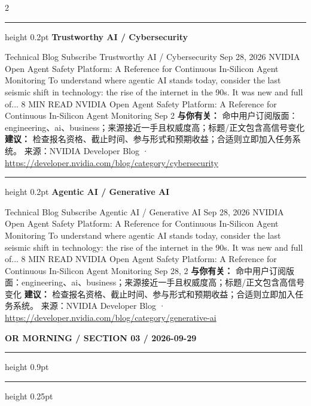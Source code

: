 \documentclass[10.5pt]{ctexart}
\begin{document}
\begin{multicols}{2}
\vspace{2mm}
\hrule height 0.2pt
\vspace{2mm}
{\large\bfseries Trustworthy AI / Cybersecurity}\par
Technical Blog Subscribe Trustworthy AI / Cybersecurity Sep 28, 2026 NVIDIA Open Agent Safety Platform: A Reference for Continuous In-Silicon Agent Monitoring To understand where agentic AI stands today, consider the last seismic shift in technology: the rise of the internet in the 90s. It was new and full of... 8 MIN READ NVIDIA Open Agent Safety Platform: A Reference for Continuous In-Silicon Agent Monitoring Sep 2
\textbf{与你有关：} 命中用户订阅版面：engineering、ai、business；来源接近一手且权威度高；标题/正文包含高信号变化
\textbf{建议：} 检查报名资格、截止时间、参与形式和预期收益；合适则立即加入任务系统。
{\footnotesize\color{ormuted} 来源：NVIDIA Developer Blog · \url{https://developer.nvidia.com/blog/category/cybersecurity}}
\vspace{2mm}
\hrule height 0.2pt
\vspace{2mm}
{\large\bfseries Agentic AI / Generative AI}\par
Technical Blog Subscribe Agentic AI / Generative AI Sep 28, 2026 NVIDIA Open Agent Safety Platform: A Reference for Continuous In-Silicon Agent Monitoring To understand where agentic AI stands today, consider the last seismic shift in technology: the rise of the internet in the 90s. It was new and full of... 8 MIN READ NVIDIA Open Agent Safety Platform: A Reference for Continuous In-Silicon Agent Monitoring Sep 28, 2
\textbf{与你有关：} 命中用户订阅版面：engineering、ai、business；来源接近一手且权威度高；标题/正文包含高信号变化
\textbf{建议：} 检查报名资格、截止时间、参与形式和预期收益；合适则立即加入任务系统。
{\footnotesize\color{ormuted} 来源：NVIDIA Developer Blog · \url{https://developer.nvidia.com/blog/category/generative-ai}}
\end{multicols}
\newpage
{\small\bfseries OR MORNING / SECTION 03 / 2026-09-29}
\vspace{2mm}
\hrule height 0.9pt
\vspace{1.5mm}
\hrule height 0.25pt
\vspace{4mm}
\end{document}
